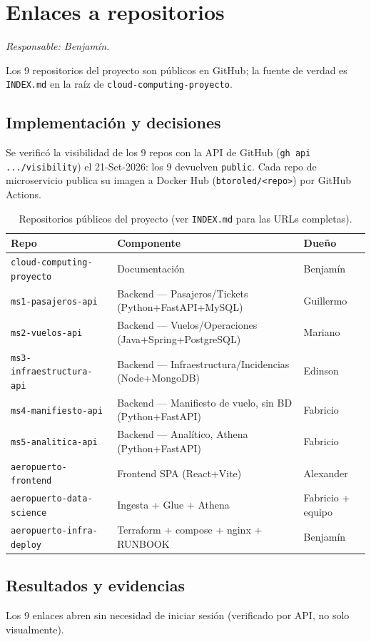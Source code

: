 \section{Enlaces a repositorios}
\textit{Responsable: Benjamín.}

Los 9 repositorios del proyecto son públicos en GitHub; la fuente de verdad es
\texttt{INDEX.md} en la raíz de \texttt{cloud-computing-proyecto}.

\subsection{Implementación y decisiones}

Se verificó la visibilidad de los 9 repos con la API de GitHub (\texttt{gh api .../visibility})
el 21-Set-2026: los 9 devuelven \texttt{public}. Cada repo de microservicio publica su imagen a
Docker Hub (\texttt{btoroled/\textless{}repo\textgreater{}}) por GitHub Actions.

\begin{table}[htbp]
\centering\small
\begin{tabularx}{\textwidth}{p{}Xl}
\toprule Repo & Componente & Dueño \\
\midrule
\texttt{cloud-computing-proyecto} & Documentación & Benjamín \\
\texttt{ms1-pasajeros-api} & Backend — Pasajeros/Tickets (Python+FastAPI+MySQL) & Guillermo \\
\texttt{ms2-vuelos-api} & Backend — Vuelos/Operaciones (Java+Spring+PostgreSQL) & Mariano \\
\texttt{ms3-infraestructura-api} & Backend — Infraestructura/Incidencias (Node+MongoDB) & Edinson \\
\texttt{ms4-manifiesto-api} & Backend — Manifiesto de vuelo, sin BD (Python+FastAPI) & Fabricio \\
\texttt{ms5-analitica-api} & Backend — Analítico, Athena (Python+FastAPI) & Fabricio \\
\texttt{aeropuerto-frontend} & Frontend SPA (React+Vite) & Alexander \\
\texttt{aeropuerto-data-science} & Ingesta + Glue + Athena & Fabricio + equipo \\
\texttt{aeropuerto-infra-deploy} & Terraform + compose + nginx + RUNBOOK & Benjamín \\
\bottomrule
\end{tabularx}
\caption{Repositorios públicos del proyecto (ver \texttt{INDEX.md} para las URLs completas).}
\end{table}

\subsection{Resultados y evidencias}

Los 9 enlaces abren sin necesidad de iniciar sesión (verificado por API, no solo visualmente).
